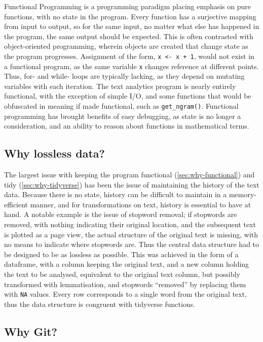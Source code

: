 \documentclass[11pt, a4paper, titlepage]{report}
\begin{document}
Functional Programming is a programming paradigm placing emphasis on
pure functions, with no state in the program. Every function has a
surjective mapping from input to output, so for the same input, no
matter what else has happened in the program, the same output should
be expected. This is often contrasted with object-oriented
programming, wherein objects are created that change state as the
program progresses. Assignment of the form, \texttt{x <- x +
  1}, would not exist in a functional program, as the same variable
\texttt{x} changes reference at different points. Thus, for-
and while- loops are typically lacking, as they depend on mutating
variables with each iteration. The text analytics program is nearly
entirely functional, with the exception of simple I/O, and some
functions that would be obfuscated in meaning if made functional, such
as \texttt{get_ngram()}. Functional programming has brought
benefits of easy debugging, as state is no longer a consideration, and
an ability to reason about functions in mathematical terms.

\subsection{Why lossless data?}

The largest issue with keeping the program functional
(\underline{\cref{sec:why-functional}}) and tidy
(\cref{sec:why-tidyverse}) has been the issue of maintaining the
history of the text data. Because there is no state, history can be
difficult to maintain in a memory-efficient manner, and for
transformations on text, history is essential to have at hand. A
notable example is the issue of stopword removal; if stopwords are
removed, with nothing indicating their original location, and the
subsequent text is plotted as a page view, the actual structure of the
original text is missing, with no means to indicate where stopwords
are. Thus the central data structure had to be designed to be as
lossless as possible. This was achieved in the form of a dataframe,
with a column keeping the original text, and a new column holding the
text to be analysed, equivalent to the original text column, but
possibly transformed with lemmatisation, and stopwords ``removed'' by
replacing them with \texttt{NA} values. Every row corresponds
to a single word from the original text, thus the data structure is
congruent with tidyverse functions.

\subsection{Why Git?}
\end{document}
